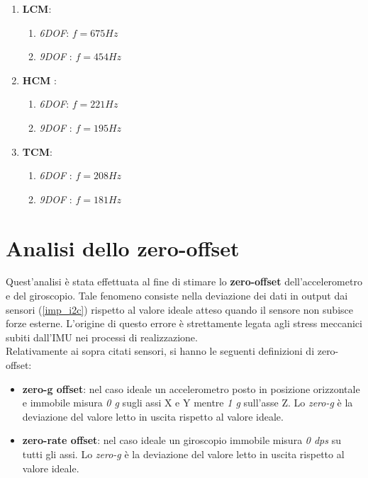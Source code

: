 \begin{enumerate}
	\item \textbf{LCM}:
	\begin{enumerate}
		\item \textit{6DOF}: $f = 675 Hz $
		\item \textit{9DOF} : $f = 454 Hz $
	\end{enumerate}
	\item \textbf{HCM} :
	\begin{enumerate}
		\item \textit{6DOF}: $f = 221 Hz $
		\item \textit{9DOF} : $f = 195 Hz $
	\end{enumerate}
	\item \textbf{TCM}:
	\begin{enumerate}
		\item \textit{6DOF} : $f = 208 Hz $
		\item \textit{9DOF} : $f = 181 Hz $
	\end{enumerate}
\end{enumerate}

\section{Analisi dello zero-offset}
Quest'analisi è stata effettuata al fine di stimare lo \textbf{zero-offset} dell'accelerometro e del giroscopio. Tale fenomeno consiste nella deviazione dei dati in output dai sensori (\ref{imp_i2c}) rispetto al valore ideale atteso quando il sensore non subisce forze esterne. L'origine di questo errore è strettamente legata agli stress meccanici subiti dall'IMU nei processi di realizzazione.\\
Relativamente ai sopra citati sensori, si hanno le seguenti definizioni di zero-offset:
\begin{itemize}
	\item \textbf{zero-g offset}: nel caso ideale un accelerometro posto in posizione orizzontale e immobile misura \textit{0 g} sugli assi X e Y mentre \textit{1 g} sull'asse Z. Lo \textit{zero-g} è la deviazione del valore letto in uscita rispetto al valore ideale.
	\item \textbf{zero-rate offset}: nel caso ideale un giroscopio immobile misura \textit{0 dps} su tutti gli assi. Lo \textit{zero-g} è la deviazione del valore letto in uscita rispetto al valore ideale.
\end{itemize}

